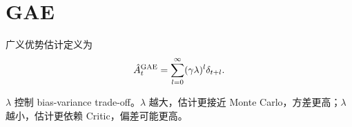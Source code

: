 \section{GAE}

广义优势估计定义为
\[
  \hat{A}^{\mathrm{GAE}}_t
  =
  \sum_{l=0}^{\infty}(\gamma\lambda)^l\delta_{t+l}.
\]

$\lambda$ 控制 bias-variance trade-off。$\lambda$ 越大，估计更接近 Monte Carlo，方差更高；$\lambda$ 越小，估计更依赖 Critic，偏差可能更高。
